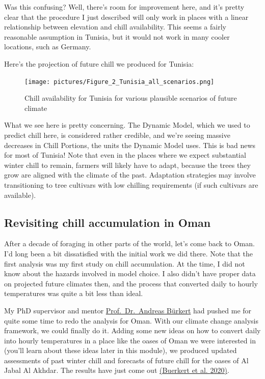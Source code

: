 \documentclass[
]{book}
\begin{document}
Was this confusing? Well, there's room for improvement here, and it's pretty clear that the procedure I just described will only work in places with a linear relationship between elevation and chill availability. This seems a fairly reasonable assumption in Tunisia, but it would not work in many cooler locations, such as Germany.

Here's the projection of future chill we produced for Tunisia:

\begin{figure}
\centering
\texttt{[image: pictures/Figure\_2\_Tunisia\_all\_scenarios.png]}
\caption{Chill availability for Tunisia for various plausible scenarios of future climate}
\end{figure}

What we see here is pretty concerning. The Dynamic Model, which we used to predict chill here, is considered rather credible, and we're seeing massive decreases in Chill Portions, the units the Dynamic Model uses. This is bad news for most of Tunisia! Note that even in the places where we expect substantial winter chill to remain, farmers will likely have to adapt, because the trees they grow are aligned with the climate of the past. Adaptation strategies may involve transitioning to tree cultivars with low chilling requirements (if such cultivars are available).

\hypertarget{revisiting-chill-accumulation-in-oman}{%
\subsection{Revisiting chill accumulation in Oman}\label{revisiting-chill-accumulation-in-oman}}

After a decade of foraging in other parts of the world, let's come back to Oman. I'd long been a bit dissatisfied with the initial work we did there. Note that the first analysis was my first study on chill accumulation. At the time, I did not know about the hazards involved in model choice. I also didn't have proper data on projected future climates then, and the process that converted daily to hourly temperatures was quite a bit less than ideal.

My PhD supervisor and mentor \href{https://scholar.google.de/citations?user=ZNvcJJ8AAAAJ\&hl=de}{Prof.~Dr.~Andreas Bürkert} had pushed me for quite some time to redo the analysis for Oman. With our climate change analysis framework, we could finally do it. Adding some new ideas on how to convert daily into hourly temperatures in a place like the oases of Oman we were interested in (you'll learn about these ideas later in this module), we produced updated assessments of past winter chill and forecasts of future chill for the oases of Al Jabal Al Akhdar. The results have just come out \href{https://link.springer.com/article/10.1007/s10584-020-02862-8}{(Buerkert et al. \protect\hyperlink{ref-buerkert2020revisiting}{2020})}.
\end{document}
